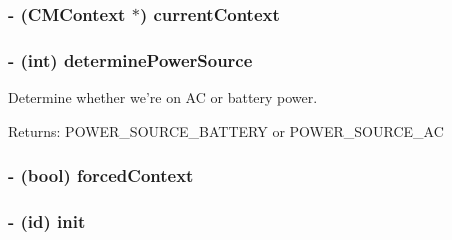 \hypertarget{interface_c_m_context_controller_da04581b2bd50c7d6ddac62a42037b9d}{
\subsubsection[currentContext]{\setlength{\rightskip}{0pt plus 5cm}- ({\bf CMContext} $\ast$) {\bf currentContext} }}
\label{interface_c_m_context_controller_da04581b2bd50c7d6ddac62a42037b9d}


\hypertarget{interface_c_m_context_controller_63988f35d5d21aab75337e47e8fa7184}{
\subsubsection[determinePowerSource]{\setlength{\rightskip}{0pt plus 5cm}- (int) determinePowerSource }}
\label{interface_c_m_context_controller_63988f35d5d21aab75337e47e8fa7184}


Determine whether we're on AC or battery power.

\begin{Desc}
\item[Returns:]POWER\_\-SOURCE\_\-BATTERY or POWER\_\-SOURCE\_\-AC \end{Desc}
\hypertarget{interface_c_m_context_controller_0aa1da85f94500590161d868d9a18b6f}{
\subsubsection[forcedContext]{\setlength{\rightskip}{0pt plus 5cm}- (bool) {\bf forcedContext} }}
\label{interface_c_m_context_controller_0aa1da85f94500590161d868d9a18b6f}


\hypertarget{interface_c_m_context_controller_6ba2a92209cbd3485e5c13164fb19e58}{
\subsubsection[init]{\setlength{\rightskip}{0pt plus 5cm}- (id) init }}
\label{interface_c_m_context_controller_6ba2a92209cbd3485e5c13164fb19e58}


